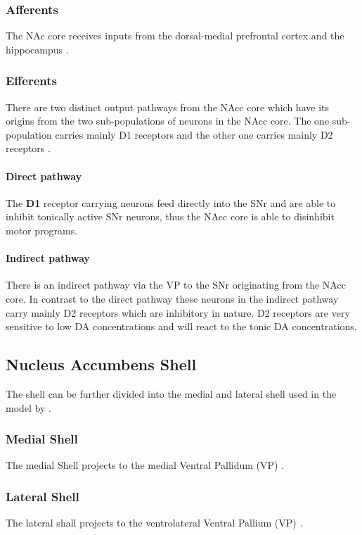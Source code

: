 \documentclass[12pt,a4paper]{article}
\begin{document}
\subsubsection{Afferents}
The NAc core receives inputs from the dorsal-medial prefrontal cortex
and the hippocampus \citep{brog93}.

\subsubsection{Efferents}
There are two distinct output pathways from the NAcc core which have
its origins from the two sub-populations of neurons in the NAcc
core. The one sub-population carries mainly D1 receptors and the other
one carries mainly D2 receptors \citep{kelley04,Humphries2010}.

\paragraph{Direct pathway}
The \textbf{D1} receptor carrying neurons feed directly into the SNr and are
able to inhibit tonically active SNr neurons, thus the NAcc core is
able to disinhibit motor programs.

\paragraph{Indirect pathway}
There is an indirect pathway via the VP to the SNr originating from
the NAcc core. In contrast to the direct pathway these neurons in the
indirect pathway carry mainly D2 receptors which are inhibitory in
nature. D2 receptors are very sensitive to low DA concentrations and
will react to the tonic DA concentrations.




\subsection{Nucleus Accumbens Shell\label{shell}}
The shell can be further divided into the medial and lateral shell
\citep{Ikemoto2007,Usuda1998} used in the model by
\citep{Humphries2010}.

\subsubsection{Medial Shell}
The medial Shell projects to the medial Ventral Pallidum (VP)
\citep{Ikemoto2007}.

\subsubsection{Lateral Shell}
The lateral shall projects to the ventrolateral Ventral Pallium (VP)
\citep{Ikemoto2007}.
\end{document}
